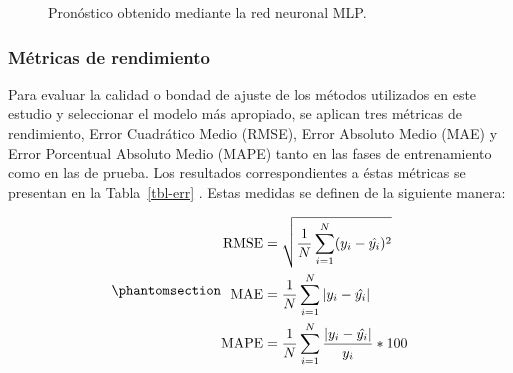 \documentclass[
  letterpaper,
  DIV=11,
  numbers=noendperiod]{scrreport}
\theoremstyle{plain}
\theoremstyle{definition}
\theoremstyle{definition}
\theoremstyle{plain}
\theoremstyle{remark}
\begin{document}
\begin{figure}


\caption{\label{fig-pmlp}Pronóstico obtenido mediante la red neuronal
MLP.}

\end{figure}%

\subsubsection{Métricas de
rendimiento}\label{muxe9tricas-de-rendimiento}

Para evaluar la calidad o bondad de ajuste de los métodos utilizados en
este estudio y seleccionar el modelo más apropiado, se aplican tres
métricas de rendimiento, Error Cuadrático Medio (RMSE), Error Absoluto
Medio (MAE) y Error Porcentual Absoluto Medio (MAPE) tanto en las fases
de entrenamiento como en las de prueba. Los resultados correspondientes
a éstas métricas se presentan en la Tabla~\ref{tbl-err} . Estas medidas
se definen de la siguiente manera:

\begin{equation}\phantomsection\label{eq-metricas}{
\begin{split}\text{RMSE}&=\sqrt{\frac{1}{N}\sum_{i=1}^N (y_i-\hat{y_i})^2}\\ \text{MAE}&=\frac{1}{N}\sum_{i=1}^N |y_i-\hat{y_i}|\\ 
\text{MAPE}&=\frac{1}{N}\sum_{i=1}^N\frac{|y_i-\hat{y_i}|}{y_i}*100\end{split}
}\end{equation}
\end{document}
